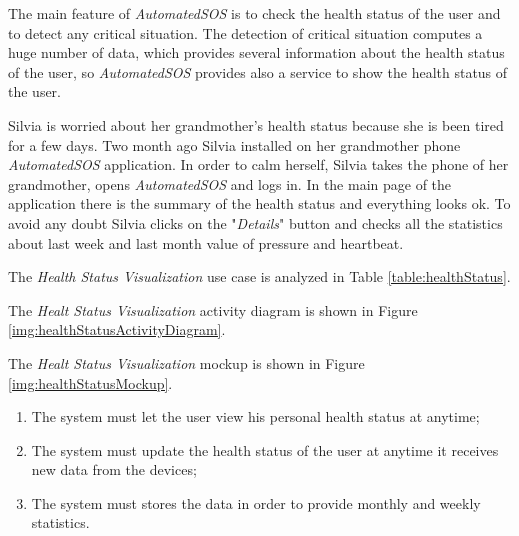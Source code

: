 The main feature of \textit{AutomatedSOS} is to check the health status of the user and to detect any critical situation.
The detection of critical situation computes a huge number of data, which provides several information about the health status of the user, so \textit{AutomatedSOS} provides also a service to show the health status of the user.

Silvia is worried about her grandmother's health status because she is been tired for a few days. Two month ago Silvia installed on her grandmother phone \textit{AutomatedSOS} application.
In order to calm herself, Silvia takes the phone of her grandmother, opens \textit{AutomatedSOS} and logs in.
In the main page of the application there is the summary of the health status and everything looks ok.
To avoid any doubt Silvia clicks on the "\textit{Details}" button and checks all the statistics about last week and last month value of pressure and heartbeat.

The \textit{Health Status Visualization} use case is analyzed in Table \ref{table:healthStatus}.

The \textit{Healt Status Visualization} activity diagram is shown in Figure \ref{img:healthStatusActivityDiagram}.

The \textit{Healt Status Visualization} mockup is shown in Figure \ref{img:healthStatusMockup}.

\begin{enumerate}
  \item The system must let the user view his personal health status at anytime;
  \item The system must update the health status of the user at anytime it receives new data from the devices;
  \item The system must stores the data in order to provide monthly and weekly statistics.
\end{enumerate}

